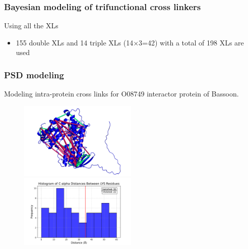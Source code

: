 \documentclass[a4paper,8pt]{beamer}
\begin{document}
\begin{frame}
  \frametitle{Bayesian modeling of trifunctional cross linkers}
  \begin{block}{Using all the XLs}
    \begin{itemize}
      \item 155 double XLs and 14 triple XLs (14$\times$3=42) with a 
      total of 198 XLs are used
    \end{itemize}
  \end{block}
  \end{frame}
%
\begin{frame}
\frametitle{PSD modeling}
Modeling intra-protein cross links for O08749 interactor protein of Bassoon. 
\begin{figure}
\centering
\includegraphics[width=0.5\textwidth]{figures/xls_mapped.png}
\includegraphics[width=0.5\textwidth]{figures/distances_O08749.pdf}
\end{figure}
\end{frame}
\end{document}
